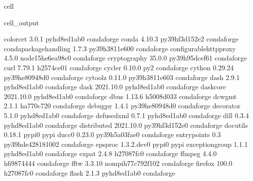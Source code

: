 \documentclass[letterpaper,table,10pt,english]{jupyterBook}
\begin{document}
\begin{sphinxuseclass}{cell}
\begin{sphinxVerbatimOutput}
\begin{sphinxuseclass}{cell_output}
\begin{sphinxVerbatim}[commandchars=\\\{\}]
colorcet                  3.0.1              pyhd8ed1ab\PYGZus{}0    conda\PYGZhy{}forge
conda                     4.10.3           py39hf3d152e\PYGZus{}2    conda\PYGZhy{}forge
conda\PYGZhy{}package\PYGZhy{}handling    1.7.3            py39h3811e60\PYGZus{}0    conda\PYGZhy{}forge
configurable\PYGZhy{}http\PYGZhy{}proxy   4.5.0           node15\PYGZus{}he6ea98c\PYGZus{}0    conda\PYGZhy{}forge
cryptography              35.0.0           py39h95dcef6\PYGZus{}1    conda\PYGZhy{}forge
curl                      7.79.1               h2574ce0\PYGZus{}1    conda\PYGZhy{}forge
cycler                    0.10.0                     py\PYGZus{}2    conda\PYGZhy{}forge
cython                    0.29.24          py39he80948d\PYGZus{}0    conda\PYGZhy{}forge
cytoolz                   0.11.0           py39h3811e60\PYGZus{}3    conda\PYGZhy{}forge
dash                      2.9.1              pyhd8ed1ab\PYGZus{}0    conda\PYGZhy{}forge
dask                      2021.10.0          pyhd8ed1ab\PYGZus{}0    conda\PYGZhy{}forge
dask\PYGZhy{}core                 2021.10.0          pyhd8ed1ab\PYGZus{}0    conda\PYGZhy{}forge
dbus                      1.13.6               h5008d03\PYGZus{}3    conda\PYGZhy{}forge
dcw\PYGZhy{}gmt                   2.1.1                ha770c72\PYGZus{}0    conda\PYGZhy{}forge
debugpy                   1.4.1            py39he80948d\PYGZus{}0    conda\PYGZhy{}forge
decorator                 5.1.0              pyhd8ed1ab\PYGZus{}0    conda\PYGZhy{}forge
defusedxml                0.7.1              pyhd8ed1ab\PYGZus{}0    conda\PYGZhy{}forge
dill                      0.3.4              pyhd8ed1ab\PYGZus{}0    conda\PYGZhy{}forge
distributed               2021.10.0        py39hf3d152e\PYGZus{}0    conda\PYGZhy{}forge
docutils                  0.18.1                   pypi\PYGZus{}0    pypi
ducc0                     0.23.0           py39h5a03fae\PYGZus{}0    conda\PYGZhy{}forge
entrypoints               0.3             py39hde42818\PYGZus{}1002    conda\PYGZhy{}forge
epsproc                   1.3.2.dev0               pypi\PYGZus{}0    pypi
exceptiongroup            1.1.1              pyhd8ed1ab\PYGZus{}0    conda\PYGZhy{}forge
expat                     2.4.8                h27087fc\PYGZus{}0    conda\PYGZhy{}forge
ffmpeg                    4.4.0                h6987444\PYGZus{}4    conda\PYGZhy{}forge
fftw                      3.3.10          nompi\PYGZus{}h77c792f\PYGZus{}102    conda\PYGZhy{}forge
firefox                   100.0                h27087fc\PYGZus{}0    conda\PYGZhy{}forge
flask                     2.1.3              pyhd8ed1ab\PYGZus{}0    conda\PYGZhy{}forge

\end{sphinxVerbatim}
\end{sphinxuseclass}
\end{sphinxVerbatimOutput}
\end{sphinxuseclass}
\end{document}
